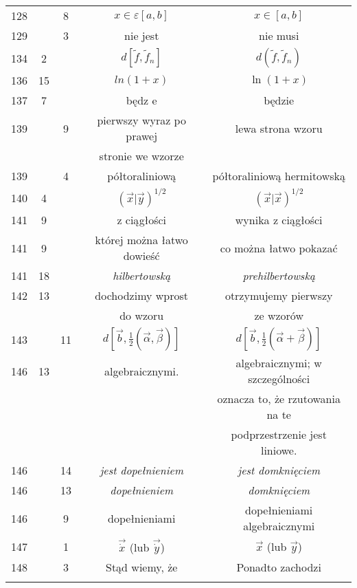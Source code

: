\documentclass[a4paper]{article}
\newcommand{\fr}{\frac}
\newcommand{\al}{\alpha}
\newcommand{\be}{\beta}
\newcommand{\veps}{\varepsilon}
\begin{document}
\begin{center}
\begin{tabular}{|c|c|c|c|c|}
    128 & & 8 & $x \in \veps [ a, b ]$ & $x \in [ a, b ]$ \\
    129 & & 3 & nie jest & nie musi \\
    134 & 2 & & $d[ \tilde{ f }, \tilde{ f }_{ n } ]$
           & $d( \tilde{ f }, \tilde{ f }_{ n } )$ \\
    136 & 15 & & $ln( 1 + x )$ & $\ln( 1 + x )$ \\
    137 & 7 & & będz e & będzie \\
    139 & & 9 & pierwszy wyraz po prawej & lewa strona wzoru \\
    & & & stronie we wzorze & \\
    139 & & 4 & półtoraliniową & półtoraliniową hermitowską \\
    140 & 4 & & $( \vec{ x } | \vec{ y } )^{ 1 / 2 }$
           & $( \vec{ x } | \vec{ x } )^{ 1 / 2 }$ \\
    141 & 9 & & z ciągłości & wynika z ciągłości \\
    141 & 9 & & której można łatwo dowieść & co można łatwo pokazać \\
    141 & 18 & & \emph{hilbertowską} & \emph{prehilbertowską} \\
    142 & 13 & & dochodzimy wprost & otrzymujemy pierwszy \\
    & & & do wzoru & ze wzorów \\
    143 & & 11 & $d[ \vec{ b }, \fr{ 1 }{ 2 } ( \vec{ \al },
                 \vec{ \be }) ]$ 
           & $d[ \vec{ b }, \fr{ 1 }{ 2 } ( \vec{ \al }
             + \vec{ \be }) ]$ \\
    146 & 13 & & algebraicznymi. & algebraicznymi; w szczególności \\
    & & & & oznacza to, że rzutowania na te \\
    & & & & podprzestrzenie jest liniowe. \\
    146 & & 14 & \emph{jest dopełnieniem} & \emph{jest domknięciem} \\
    146 & & 13 & \emph{dopełnieniem} & \emph{domknięciem} \\
    146 & & 9 & dopełnieniami & dopełnieniami algebraicznymi \\
    147 & & 1 & $\vec{ \dot{ x } }$ (lub $\vec{ \dot{ y } }$)
           & $\vec{ x }$ (lub $\vec{ y }$) \\
    148 & & 3 & Stąd wiemy, że & Ponadto zachodzi \\
    & & & & \\ \hline
  \end{tabular}


\end{center}
\end{document}
